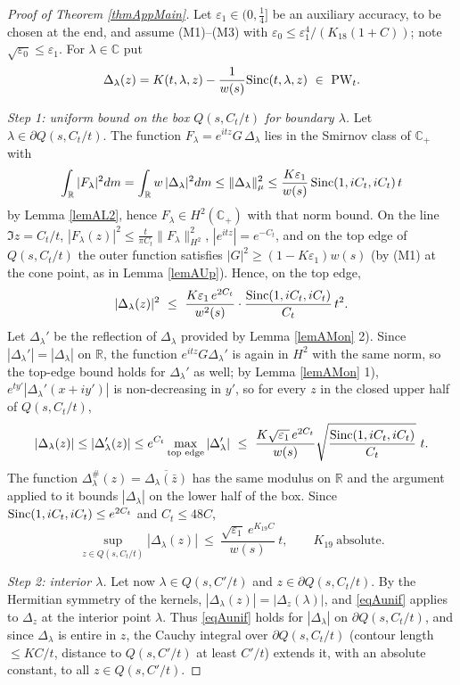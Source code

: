 \documentclass[11pt,twoside,reqno]{amsart}
\def\PW{\text{\rm PW}}
\def\pa{\partial}
\def\R{{\mathbb R}}
\def\C{{\mathbb{C}}}
\def\DD{{\mathcal{D}}}
\def\e{\varepsilon}
\def\DD{\Delta}
\def\l{\lambda}
\def\S{\text{\rm Sinc}}
\theoremstyle{plain}
\numberwithin{equation}{section}
\begin{document}
\begin{proof}[Proof of Theorem \ref{thmAppMain}]
Let $\e_1\in(0,\tfrac14]$ be an auxiliary accuracy, to be chosen at the end, and assume (M1)--(M3) with $\e_0\leq\e_1^4/(K_{18}(1+C))$; note $\sqrt{\e_0}\leq\e_1$. For $\l\in\C$ put
$$\DD_\l(z)=K(t,\l,z)-\frac1{w(s)}\S(t,\l,z)\ \in\ \PW_t .$$

{\it Step 1: uniform bound on the box $Q(s,C_t/t)$ for boundary $\l$.} Let $\l\in\pa Q(s,C_t/t)$. The function $F_\l=e^{itz}G\,\DD_\l$ lies in the Smirnov class of $\C_+$ with
$$\int_\R|F_\l|^2dm=\int_\R w\,|\DD_\l|^2dm\leq\|\DD_\l\|^2_\mu\leq\frac{K\e_1}{w(s)}\,\S(1,iC_t,iC_t)\,t$$
by Lemma \ref{lemAL2}, hence $F_\l\in H^2(\C_+)$ with that norm bound. On the line $\Im z=C_t/t$, $|F_\l(z)|^2\leq\frac{t}{\pi C_t}\|F_\l\|^2_{H^2}$, $|e^{itz}|=e^{-C_t}$, and on the top edge of $Q(s,C_t/t)$ the outer function satisfies $|G|^2\geq(1-K\e_1)w(s)$ (by (M1) at the cone point, as in Lemma \ref{lemAUp}). Hence, on the top edge,
$$|\DD_\l(z)|^2\ \leq\ \frac{K\e_1\,e^{2C_t}}{w^2(s)}\cdot\frac{\S(1,iC_t,iC_t)}{C_t}\,t^2 .$$
Let $\DD_\l'$ be the reflection of $\DD_\l$ provided by Lemma \ref{lemAMon} 2). Since $|\DD_\l'|=|\DD_\l|$ on $\R$, the function $e^{itz}G\DD_\l'$ is again in $H^2$ with the same norm, so the top-edge bound holds for $\DD_\l'$ as well; by Lemma \ref{lemAMon} 1), $e^{ty'}|\DD_\l'(x+iy')|$ is non-decreasing in $y'$, so for every $z$ in the closed upper half of $Q(s,C_t/t)$,
$$|\DD_\l(z)|\leq|\DD_\l'(z)|\leq e^{C_t}\max_{\text{top edge}}|\DD_\l'|\ \leq\ \frac{K\sqrt{\e_1}\,e^{2C_t}}{w(s)}\sqrt{\frac{\S(1,iC_t,iC_t)}{C_t}}\ t .$$
The function $\DD_\l^\#(z)=\overline{\DD_\l(\bar z)}$ has the same modulus on $\R$ and the argument applied to it bounds $|\DD_\l|$ on the lower half of the box. Since $\S(1,iC_t,iC_t)\leq e^{2C_t}$ and $C_t\leq48C$,
\begin{equation}
\sup_{z\in Q(s,C_t/t)}|\DD_\l(z)|\ \leq\ \frac{\sqrt{\e_1}\ e^{K_{19}C}}{w(s)}\ t,\qquad K_{19}\ \text{absolute}.
\label{eqAunif}
\end{equation}

{\it Step 2: interior $\l$.} Let now $\l\in Q(s,C'/t)$ and $z\in\pa Q(s,C_t/t)$. By the Hermitian symmetry of the kernels, $|\DD_\l(z)|=|\DD_z(\l)|$, and \eqref{eqAunif} applies to $\DD_z$ at the interior point $\l$. Thus \eqref{eqAunif} holds for $|\DD_\l|$ on $\pa Q(s,C_t/t)$, and since $\DD_\l$ is entire in $z$, the Cauchy integral over $\pa Q(s,C_t/t)$ (contour length $\leq KC/t$, distance to $Q(s,C'/t)$ at least $C'/t$) extends it, with an absolute constant, to all $z\in Q(s,C'/t)$.


\end{proof}
\end{document}
